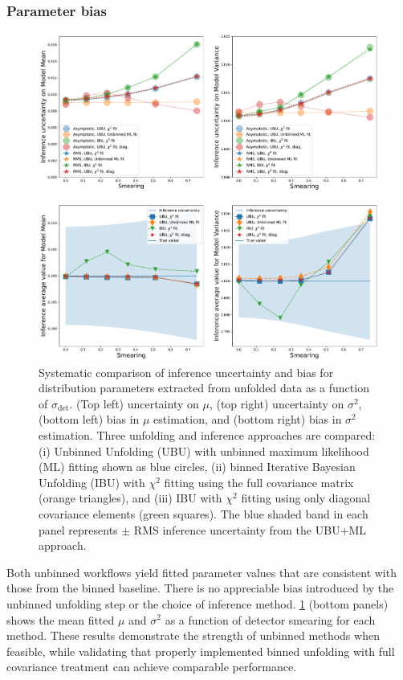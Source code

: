         \subsubsection{Parameter bias}
\begin{figure}
    \centering
    \includegraphics[width=0.95\linewidth]{figures/chapter-07/uncertainty-and-bias-vs-resolution-ibu-diag.pdf}
    \caption[Comparison between binned and unbinned parameter inference with unbinned and binned unfolding methods as a function of detector resolution.]{Systematic comparison of inference uncertainty and bias for distribution parameters extracted from unfolded data as a function of $\sigma_{\text{det}}$.
    (Top left) uncertainty on $\mu$, (top right) uncertainty on $\sigma^2$, (bottom left) bias in $\mu$ estimation, and (bottom right) bias in $\sigma^2$ estimation.
    Three unfolding and inference approaches are compared: (i) Unbinned Unfolding (UBU) with unbinned maximum likelihood (ML) fitting shown as blue circles, (ii) binned Iterative Bayesian Unfolding (IBU) with $\chi^2$ fitting using the full covariance matrix (orange triangles), and (iii) IBU with $\chi^2$ fitting using only diagonal covariance elements (green squares). The blue shaded band in each panel represents $\pm$ RMS inference uncertainty from the UBU+ML approach.\footnotemark
}
    \label{fig:uncertainty-and-bias-vs-resolution}
\end{figure}
            Both unbinned workflows yield fitted parameter values that are consistent with those from the binned baseline.
            There is no appreciable bias introduced by the unbinned unfolding step or the choice of inference method.
            \cref{fig:uncertainty-and-bias-vs-resolution} (bottom panels) shows the mean fitted $\mu$ and $\sigma^2$ as a function of detector smearing for each method.
            These results demonstrate the strength of unbinned methods when feasible, while validating that properly implemented binned unfolding with full covariance treatment can achieve comparable performance.
            
